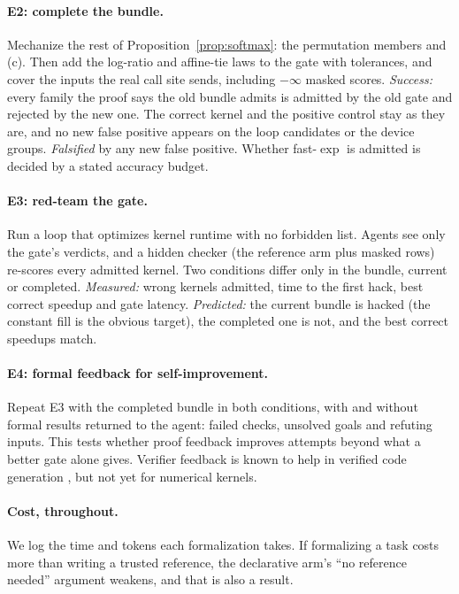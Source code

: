 \paragraph{E2: complete the bundle.}
Mechanize the rest of Proposition~\ref{prop:softmax}: the permutation members and (c).
Then add the log-ratio and affine-tie laws to
the gate with tolerances, and cover the inputs the real call site sends, including
$-\infty$ masked scores. \emph{Success:} every family the proof says the old bundle admits
is admitted by the old gate and rejected by the new one. The correct kernel and the
positive control stay as they are, and no new false positive appears on the
\loopCandidates{} loop candidates or the \fpGroups{} device groups. \emph{Falsified} by any
new false positive. Whether fast-$\exp$ is admitted is decided by a stated accuracy
budget.

\paragraph{E3: red-team the gate.}
Run a loop that optimizes kernel runtime with no forbidden list. Agents see only the
gate's verdicts, and a hidden checker (the reference arm plus masked rows) re-scores every
admitted kernel. Two conditions differ only in the bundle, current or completed.
\emph{Measured:} wrong kernels admitted, time to the first hack, best correct speedup and
gate latency. \emph{Predicted:} the current bundle is hacked (the constant fill is the
obvious target), the completed one is not, and the best correct speedups match.

\paragraph{E4: formal feedback for self-improvement.}
Repeat E3 with the completed bundle in both conditions, with and without formal results
returned to the agent: failed checks, unsolved goals and refuting inputs. This tests
whether proof feedback improves attempts beyond what a better gate alone gives.
Verifier feedback is known to help in verified code generation
\citep{ye2025verina,aggarwal2025alphaverus}, but not yet for numerical kernels.

\paragraph{Cost, throughout.}
We log the time and tokens each formalization takes. If formalizing a task costs more
than writing a trusted reference, the declarative arm's ``no reference needed''
argument weakens, and that is also a result.
